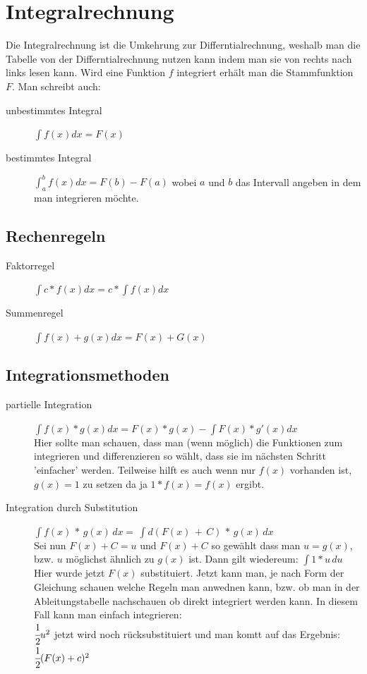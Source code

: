 \documentclass[a4paper]{scrartcl}
\begin{document}
    \section{Integralrechnung}
        Die Integralrechnung ist die Umkehrung zur Differntialrechnung, weshalb man die Tabelle von der Differntialrechnung nutzen kann indem man sie von rechts nach links lesen kann.
        Wird eine Funktion $f$ integriert erhält man die Stammfunktion $F$. Man schreibt auch:
        \begin{description}
            \item[unbestimmtes Integral] $\int f(x) dx = F(x)$
            \item[bestimmtes Integral] $\int_{a}^{b} f(x) dx = F(b) - F(a)$  wobei $a$ und $b$ das Intervall angeben in dem man integrieren möchte. 
        \end{description}
        \subsection{Rechenregeln}
            \begin{description}
                \item[Faktorregel] $\int c * f(x) dx = c * \int f(x) dx$ 
                \item[Summenregel] $\int f(x) + g(x) dx = F(x) + G(x)$  
            \end{description}
        \newpage
        \subsection{Integrationsmethoden}
        \begin{description}
            \item[partielle Integration] $\int f(x) * g(x) dx = F(x) * g(x) - \int F(x) * g'(x) dx$ \\
             Hier sollte man schauen, dass man (wenn möglich) die Funktionen zum integrieren und differenzieren so wählt, dass sie im nächsten Schritt 'einfacher' werden.  
             Teilweise hilft es auch wenn nur $f(x)$ vorhanden ist, $g(x) = 1$ zu setzen da ja $1 * f(x) = f(x)$ ergibt.
             \item[Integration durch Substitution] $\int f(x)\, * \,g(x)\, dx = \,\int d(F(x) \,+ \,C) \,* \,g(x) \,dx$ 
             \\Sei nun $F(x) + C = u$  und $F(x) + C$ so gewählt dass man $u = g(x)$, 
            bzw. $u$ möglichst ähnlich zu $g(x)$ ist. Dann gilt wiedereum: $\int 1 * u \,du $ 
            \\Hier wurde jetzt $F(x)$ substituiert. Jetzt kann man, je nach Form der Gleichung schauen welche Regeln man anwednen kann, bzw. ob man in der Ableitungstabelle nachschauen ob direkt integriert werden kann.
            In diesem Fall kann man einfach integrieren: \\$\cfrac{1}{2}u^2$ jetzt wird noch rücksubstituiert und man komtt auf das Ergebnis: $\cfrac{1}{2}(F(x) + c)^2$
        \end{description}
\end{document}
